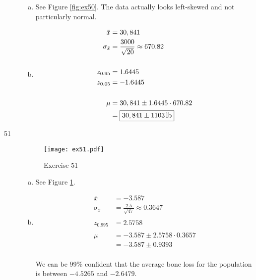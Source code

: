 \documentclass[letterpaper, landscape]{exam}
\begin{document}
\begin{description}
        \begin{enumerate}[(a)]
          \item See Figure \ref{fig:ex50}. The data actually looks left-skewed
            and not particularly normal.

          \item
            \begin{align*}
              \bar{x}          & = 30,841 \\
              \sigma_{\bar{x}} & = \frac{3000}{\sqrt{20}} \approx 670.82 \\
              \\
              z_{0.95} & = 1.6445 \\
              z_{0.05} & = -1.6445 \\
              \\
              \mu & = 30,841 \pm 1.6445 \cdot 670.82 \\
                  & = \boxed{ \unit[30,841 \pm 1103]{lb} } \\
            \end{align*}
        \end{enumerate}

      \item[51]
        \begin{figure}[H]
          \centering
          \texttt{[image: ex51.pdf]}
          \caption{Exercise 51}
          \label{fig:ex51}
        \end{figure}

        \begin{enumerate}[(a)]
          \item See Figure \ref{fig:ex51}. 

          \item
            \begin{align*}
              \bar{x}          & = -3.587 \\
              \sigma_{\bar{x}} & = \frac{2.5}{\sqrt{47}} \approx 0.3647 \\
              \\
              z_{0.995} & = 2.5758 \\
              \\
              \mu & = -3.587 \pm 2.5758 \cdot 0.3657 \\
                  & = -3.587 \pm 0.9393 \\
            \end{align*}

            We can be 99\% confident that the average bone loss for the
            population is between $-4.5265$ and $-2.6479$.


\end{enumerate}
\end{description}
\end{document}
